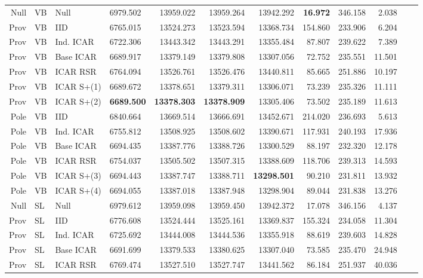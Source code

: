 \documentclass[openany, 11pt, oneside]{book}
\begin{document}
\begin{subappendices}
\begin{table}[ht]
{\begin{tabular}{rlllrrrrrrrr}
  Null & VB & Null & 6979.502 & 13959.022 & 13959.264 & 13942.292 & \textbf{16.972} & 346.158 & 2.038 \\ 
  Prov & VB & IID & 6765.015 & 13524.273 & 13523.594 & 13368.734 & 154.860 & 233.906 & 6.204 \\ 
  Prov & VB & Ind. ICAR & 6722.306 & 13443.342 & 13443.291 & 13355.484 & 87.807 & 239.622 & 7.389 \\ 
  Prov & VB & Base ICAR & 6689.917 & 13379.149 & 13379.808 & 13307.056 & 72.752 & 235.551 & 11.501 \\ 
  Prov & VB & ICAR RSR & 6764.094 & 13526.761 & 13526.476 & 13440.811 & 85.665 & 251.886 & 10.197 \\ 
  Prov & VB & ICAR S+(1) & 6689.672 & 13378.651 & 13379.311 & 13306.071 & 73.239 & 235.326 & 11.111 \\ 
  Prov & VB & ICAR S+(2) & \textbf{6689.500} & \textbf{13378.303} & \textbf{13378.909} & 13305.406 & 73.502 & 235.189 & 11.613 \\ 
  Pole & VB & IID & 6840.664 & 13669.514 & 13666.691 & 13452.671 & 214.020 & 236.693 & 5.613 \\ 
  Pole & VB & Ind. ICAR & 6755.812 & 13508.925 & 13508.602 & 13390.671 & 117.931 & 240.193 & 17.936 \\ 
  Pole & VB & Base ICAR & 6694.435 & 13387.776 & 13388.726 & 13300.529 & 88.197 & 232.320 & 12.178 \\ 
  Pole & VB & ICAR RSR & 6754.037 & 13505.502 & 13507.315 & 13388.609 & 118.706 & 239.313 & 14.593 \\ 
  Pole & VB & ICAR S+(3) & 6694.443 & 13387.747 & 13388.711 & \textbf{13298.501} & 90.210 & 231.811 & 13.932 \\ 
  Pole & VB & ICAR S+(4) & 6694.055 & 13387.018 & 13387.948 & 13298.904 & 89.044 & 231.838 & 13.276 \\ 
  \midrule
  Null & SL & Null & 6979.612 & 13959.098 & 13959.450 & 13942.372 & 17.078 & 346.156 & 4.137 \\ 
  Prov & SL & IID & 6776.608 & 13524.444 & 13525.161 & 13369.837 & 155.324 & 234.058 & 11.304 \\ 
  Prov & SL & Ind. ICAR & 6725.692 & 13444.008 & 13444.536 & 13355.918 & 88.619 & 239.603 & 14.828 \\ 
  Prov & SL & Base ICAR & 6691.699 & 13379.533 & 13380.625 & 13307.040 & 73.585 & 235.470 & 24.948 \\ 
  Prov & SL & ICAR RSR & 6769.474 & 13527.510 & 13527.747 & 13441.562 & 86.184 & 251.937 & 40.036 \\ 

\end{tabular}}
\end{table}
\end{subappendices}
\end{document}
